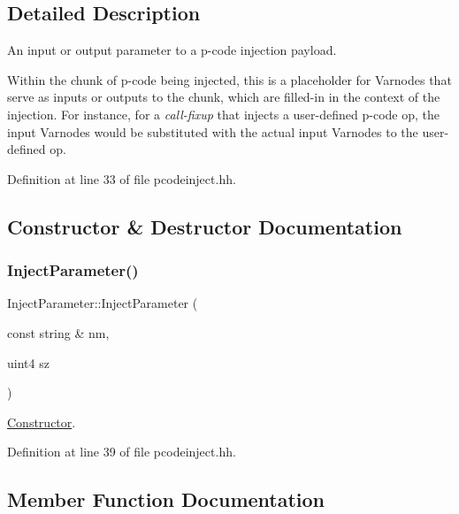 \subsection{Detailed Description}
An input or output parameter to a p-\/code injection payload. 

Within the chunk of p-\/code being injected, this is a placeholder for Varnodes that serve as inputs or outputs to the chunk, which are filled-\/in in the context of the injection. For instance, for a {\itshape call-\/fixup} that injects a user-\/defined p-\/code op, the input Varnodes would be substituted with the actual input Varnodes to the user-\/defined op. 

Definition at line 33 of file pcodeinject.\+hh.



\subsection{Constructor \& Destructor Documentation}
\mbox{\label{class_inject_parameter_a91de84dd9eafd1de37dfc56c7f526d8f}} 
\subsubsection{\texorpdfstring{InjectParameter()}{InjectParameter()}}
{\footnotesize\ttfamily Inject\+Parameter\+::\+Inject\+Parameter (\begin{DoxyParamCaption}\item[{const string \&}]{nm,  }\item[{uint4}]{sz }\end{DoxyParamCaption})\hspace{0.3cm}{\ttfamily [inline]}}



\mbox{\hyperlink{class_constructor}{Constructor}}. 



Definition at line 39 of file pcodeinject.\+hh.



\subsection{Member Function Documentation}
\mbox{\label{class_inject_parameter_a8bf408340c63bc2d301f44edf7cfa881}} 

